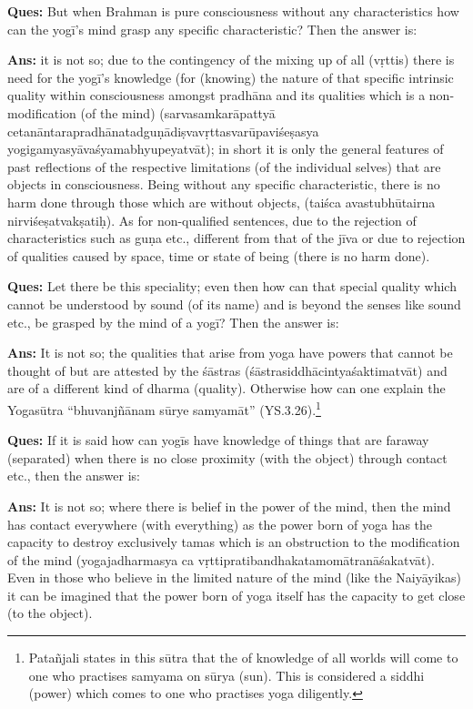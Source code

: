 \textbf{Ques:}  But when Brahman is pure consciousness without any characteristics how can the yogī’s mind grasp any specific characteristic? Then the answer is: 

\textbf{Ans:} it is not so; due to the contingency of the mixing up of all (vṛttis) there is need for the yogī’s knowledge (for (knowing) the nature of that specific intrinsic quality within consciousness amongst pradhāna and its qualities which is a non-modification (of the mind) (sarvasamkarāpattyā cetanāntarapradhānatadguṇādiṣvavṛttasvarūpaviśeṣasya yogi\-gamyasyāvaśyamabhyupeyatvāt); in short it is only the general features of past reflections of the respective limitations (of the individual selves) that are objects in consciousness. Being without any specific characteristic, there is no harm done through those which are without objects, (taiśca avastubhūtairna nirviśeṣatvakṣatiḥ). As for non-qualified sentences, due to the rejection of characteristics such as guṇa etc., different from that of the jīva or due to rejection of qualities caused by space, time or state of being (there is no harm done).

\vskip -1pt

\textbf{Ques:}  Let there be this speciality; even then how can that special quality which cannot be understood by sound (of its name) and is beyond the senses like sound etc., be grasped by the mind of a yogī? Then the answer is: 

\vskip -1pt

\textbf{Ans:} It is not so; the qualities that arise from yoga have powers that cannot be thought of but are attested by the śāstras (śāstrasiddhācintyaśaktimatvāt) and are of a different kind of dharma (quality). Otherwise how can one explain the Yogasūtra “bhuvanjñānam sūrye samyamāt” (YS.3.26).\footnote{Patañjali states in this sūtra that the of knowledge of all worlds will come to one who practises samyama on sūrya (sun). This is considered a siddhi (power) which comes to one who practises yoga diligently.} 

\vskip -1pt

\textbf{Ques:} If it is said how can yogīs have knowledge of things that are faraway (separated) when there is no close proximity (with the object) through contact etc., then the answer is: 

\vskip -1pt

\textbf{Ans:} It is not so; where there is belief in the power of the mind, then the mind has contact everywhere (with everything) as the power born of yoga has the capacity to destroy exclusively tamas which is an obstruction to the modification of the mind (yogajadharmasya ca vṛttipratibandhakatamomātranāśakatvāt). Even in those who believe in the limited nature of the mind (like the Naiyāyikas) it can be imagined that the power born of yoga itself has the capacity to get close (to the object).


